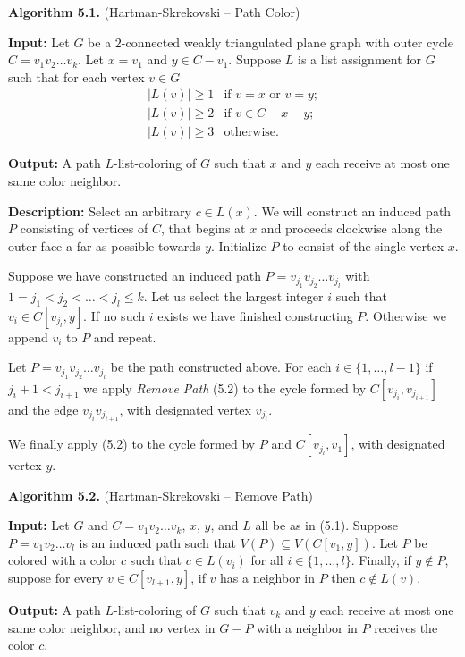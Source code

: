 \documentclass[letterpaper, 12pt]{amsart}
\theoremstyle{definition}
\theoremstyle{definition}
\theoremstyle{thm}
\theoremstyle{definition}
\begin{document}
\noindent\textbf{Algorithm 5.1.} (Hartman-Skrekovski -- Path Color)

\noindent\textbf{Input:} Let $G$ be a $2$-connected weakly triangulated plane
graph with outer cycle $C=v_1v_2\ldots v_k$. Let $x=v_1$ and $y\in C-v_1$.
Suppose $L$ is a list assignment for $G$ such that
for each vertex $v\in G$
\[
    \begin{array}{ll}
	    |L(v)|\ge 1 & \text{if } v=x \text{ or } v=y;\\
	    |L(v)|\ge 2 & \text{if } v\in C-x-y;\\
	    |L(v)|\ge 3 & \text{otherwise.}
    \end{array}
\]

\noindent\textbf{Output:} A path $L$-list-coloring of $G$ such that
$x$ and $y$ each receive at most one same color neighbor.

\noindent\textbf{Description:} Select an arbitrary $c\in L(x)$. We will construct an induced
path $P$ consisting of vertices of $C$, that begins at $x$ and proceeds
clockwise along the outer face a far as possible towards $y$. Initialize $P$ to consist of
the single vertex $x$.

Suppose we have constructed an induced path $P=v_{j_1}v_{j_2}\ldots v_{j_l}$
with $1=j_1<j_2<\ldots<j_l\le k$. Let us select the largest integer $i$ such that
$v_i\in C[v_{j_l},y]$. If no such $i$ exists we have finished constructing $P$.
Otherwise we append $v_i$ to $P$ and repeat.

Let $P=v_{j_1}v_{j_2}\ldots v_{j_l}$ be the path constructed above. For each
$i\in\{1,\ldots,l-1\}$ if $j_i+1<j_{i+1}$ we apply \textit{Remove Path} (5.2)
to the cycle formed by $C[v_{j_i},v_{j_{i+1}}]$ and the edge
$v_{j_i}v_{j_{i+1}}$, with designated vertex $v_{j_i}$.

We finally apply  (5.2) to the cycle formed by $P$ and
$C[v_{j_l},v_1]$, with designated vertex $y$.

\noindent\textbf{Algorithm 5.2.} (Hartman-Skrekovski -- Remove Path)

\noindent\textbf{Input:} Let $G$ and $C=v_1v_2\ldots v_k$, $x$, $y$, and $L$ all
be as in (5.1). Suppose $P=v_1v_2\ldots v_l$ is an induced path such that $V(P)
\subseteq V(C[v_1,y])$. Let $P$ be colored with a
color $c$ such that $c\in L(v_i)$ for all $i\in\{1,\ldots,l\}$. Finally, if
$y\not\in P$, suppose for every $v\in C[v_{l+1},y]$, if $v$ has a neighbor in $P$
then $c\not\in L(v)$.

\noindent\textbf{Output:} A path $L$-list-coloring of $G$ such that $v_k$ and
$y$ each receive at most one same color neighbor, and no vertex in
$G-P$ with a neighbor in $P$ receives the color $c$.
\end{document}
